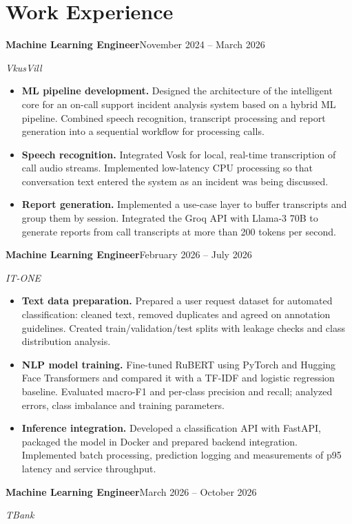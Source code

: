 \documentclass[a4paper,11pt]{article}
\newcommand{\entry}[3]{\textbf{#1}\hfill #3\par\textit{#2}\par}
\begin{document}
\section*{Work Experience}
\entry{Machine Learning Engineer}{VkusVill}{November 2024 -- March 2026}
\begin{itemize}
\item \textbf{ML pipeline development.} Designed the architecture of the intelligent core for an on-call support incident analysis system based on a hybrid ML pipeline. Combined speech recognition, transcript processing and report generation into a sequential workflow for processing calls.
\item \textbf{Speech recognition.} Integrated Vosk for local, real-time transcription of call audio streams. Implemented low-latency CPU processing so that conversation text entered the system as an incident was being discussed.
\item \textbf{Report generation.} Implemented a use-case layer to buffer transcripts and group them by session. Integrated the Groq API with Llama-3 70B to generate reports from call transcripts at more than 200 tokens per second.
\end{itemize}
\vspace{4pt}
\entry{Machine Learning Engineer}{IT-ONE}{February 2026 -- July 2026}
\begin{itemize}
\item \textbf{Text data preparation.} Prepared a user request dataset for automated classification: cleaned text, removed duplicates and agreed on annotation guidelines. Created train/validation/test splits with leakage checks and class distribution analysis.
\item \textbf{NLP model training.} Fine-tuned RuBERT using PyTorch and Hugging Face Transformers and compared it with a TF-IDF and logistic regression baseline. Evaluated macro-F1 and per-class precision and recall; analyzed errors, class imbalance and training parameters.
\item \textbf{Inference integration.} Developed a classification API with FastAPI, packaged the model in Docker and prepared backend integration. Implemented batch processing, prediction logging and measurements of p95 latency and service throughput.
\end{itemize}
\vspace{4pt}
\entry{Machine Learning Engineer}{TBank}{March 2026 -- October 2026}
\end{document}
